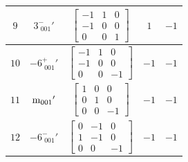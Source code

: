 \documentclass[fleqn,8pt]{jsarticle}
\begin{document}
\begin{longtable}{ccccc}
$ 9 $ & $ 3^{-}_{\,\,001}{}' $ & $ \begin{bmatrix} -1 & 1 & 0 \\ -1 & 0 & 0 \\ 0 & 0 & 1 \end{bmatrix} $ & $ 1 $ & $ -1 $ \\ \hline
$ 10 $ & $ -6^{+}_{\,\,001}{}' $ & $ \begin{bmatrix} -1 & 1 & 0 \\ -1 & 0 & 0 \\ 0 & 0 & -1 \end{bmatrix} $ & $ -1 $ & $ -1 $ \\ \hline
$ 11 $ & $ {\rm m}_{001}{}' $ & $ \begin{bmatrix} 1 & 0 & 0 \\ 0 & 1 & 0 \\ 0 & 0 & -1 \end{bmatrix} $ & $ -1 $ & $ -1 $ \\ \hline
$ 12 $ & $ -6^{-}_{\,\,001}{}' $ & $ \begin{bmatrix} 0 & -1 & 0 \\ 1 & -1 & 0 \\ 0 & 0 & -1 \end{bmatrix} $ & $ -1 $ & $ -1 $ \\
\end{longtable}
\end{document}

